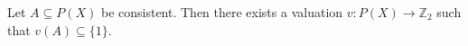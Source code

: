 Let $A \subseteq P(X)$ be consistent. Then there exists a valuation $v: P(X) \rightarrow \mathbb{Z}_2$ such that $v(A) \subseteq \{1\}$.
